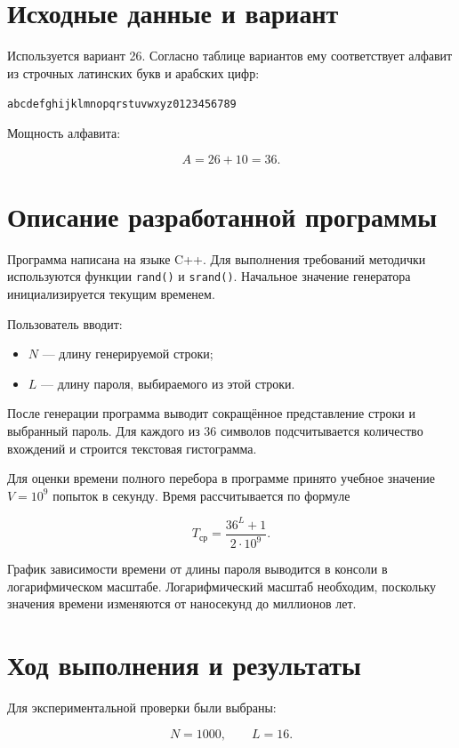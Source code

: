 \documentclass[a4paper,14pt,oneside]{extarticle}
\begin{document}
\section{Исходные данные и вариант}

Используется вариант 26. Согласно таблице вариантов ему соответствует
алфавит из строчных латинских букв и арабских цифр:

\begin{center}
\texttt{abcdefghijklmnopqrstuvwxyz0123456789}
\end{center}

Мощность алфавита:

\[
A=26+10=36.
\]

\section{Описание разработанной программы}

Программа написана на языке C++. Для выполнения требований методички
используются функции \texttt{rand()} и \texttt{srand()}. Начальное значение
генератора инициализируется текущим временем.

Пользователь вводит:
\begin{itemize}
\item $N$ --- длину генерируемой строки;
\item $L$ --- длину пароля, выбираемого из этой строки.
\end{itemize}

После генерации программа выводит сокращённое представление строки и
выбранный пароль. Для каждого из 36 символов подсчитывается количество
вхождений и строится текстовая гистограмма.

Для оценки времени полного перебора в программе принято учебное значение
$V=10^9$ попыток в секунду. Время рассчитывается по формуле

\[
T_{\text{ср}}=\frac{36^L+1}{2\cdot 10^9}.
\]

График зависимости времени от длины пароля выводится в консоли в
логарифмическом масштабе. Логарифмический масштаб необходим, поскольку
значения времени изменяются от наносекунд до миллионов лет.

\section{Ход выполнения и результаты}

Для экспериментальной проверки были выбраны:

\[
N=1000,\qquad L=16.
\]
\end{document}
